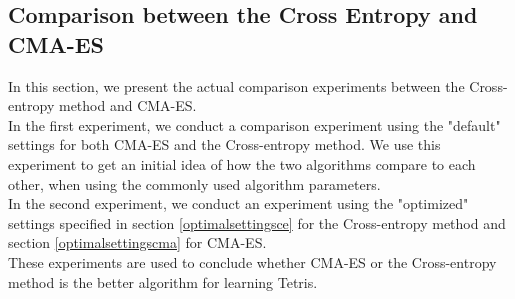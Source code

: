 \subsection{Comparison between the Cross Entropy and CMA-ES}

In this section, we present the actual comparison experiments between the Cross-entropy method
and CMA-ES.\\
In the first experiment, we conduct a comparison experiment using the 
"default" settings for both CMA-ES and the Cross-entropy method. We use this experiment to
get an initial idea of how the two algorithms compare to each other, when using the commonly
used algorithm parameters.\\
In the second experiment, we conduct an experiment using the "optimized" settings
specified in section \ref{optimalsettingsce} for the Cross-entropy method and section
\ref{optimalsettingscma} for CMA-ES.\\
These experiments are used to conclude whether CMA-ES or the Cross-entropy method
is the better algorithm for learning Tetris.






